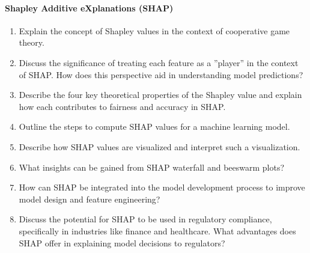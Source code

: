 \paragraph*{Shapley Additive eXplanations (SHAP)}
\begin{enumerate}
    \item Explain the concept of Shapley values in the context of cooperative game theory.
    \item Discuss the significance of treating each feature as a ''player'' in the context of SHAP. How does this perspective aid in understanding model predictions?
    \item Describe the four key theoretical properties of the Shapley value and explain how each contributes to fairness and accuracy in SHAP.
    \item Outline the steps to compute SHAP values for a machine learning model.
    \item Describe how SHAP values are visualized and interpret such a visualization.
    \item What insights can be gained from SHAP waterfall and beeswarm plots? 
    \item How can SHAP be integrated into the model development process to improve model design and feature engineering?
    \item Discuss the potential for SHAP to be used in regulatory compliance, specifically in industries like finance and healthcare. What advantages does SHAP offer in explaining model decisions to regulators?
\end{enumerate}
